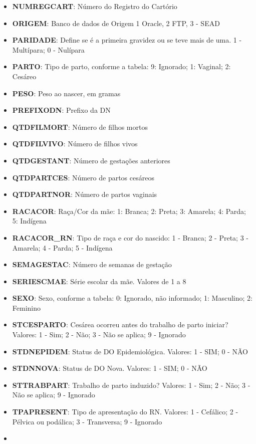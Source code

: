 \documentclass[
]{article}
\begin{document}
\begin{itemize}
\item
  \textbf{NUMREGCART}: Número do Registro do Cartório
\item
  \textbf{ORIGEM}: Banco de dados de Origem 1 Oracle, 2 FTP, 3 - SEAD
\item
  \textbf{PARIDADE}: Define se é a primeira gravidez ou se teve mais de
  uma. 1 - Multípara; 0 - Nulípara
\item
  \textbf{PARTO}: Tipo de parto, conforme a tabela: 9: Ignorado; 1:
  Vaginal; 2: Cesáreo
\item
  \textbf{PESO}: Peso ao nascer, em gramas
\item
  \textbf{PREFIXODN}: Prefixo da DN
\item
  \textbf{QTDFILMORT}: Número de filhos mortos
\item
  \textbf{QTDFILVIVO}: Número de filhos vivos
\item
  \textbf{QTDGESTANT}: Número de gestações anteriores
\item
  \textbf{QTDPARTCES}: Número de partos cesáreos
\item
  \textbf{QTDPARTNOR}: Número de partos vaginais
\item
  \textbf{RACACOR}: Raça/Cor da mãe: 1: Branca; 2: Preta; 3: Amarela; 4:
  Parda; 5: Indígena
\item
  \textbf{RACACOR\_RN}: Tipo de raça e cor do nascido: 1 - Branca; 2 -
  Preta; 3 - Amarela; 4 - Parda; 5 - Indígena
\item
  \textbf{SEMAGESTAC}: Número de semanas de gestação
\item
  \textbf{SERIESCMAE}: Série escolar da mãe. Valores de 1 a 8
\item
  \textbf{SEXO}: Sexo, conforme a tabela: 0: Ignorado, não informado; 1:
  Masculino; 2: Feminino
\item
  \textbf{STCESPARTO}: Cesárea ocorreu antes do trabalho de parto
  iniciar? Valores: 1 - Sim; 2 - Não; 3 - Não se aplica; 9 - Ignorado
\item
  \textbf{STDNEPIDEM}: Status de DO Epidemiológica. Valores: 1 - SIM; 0
  - NÃO
\item
  \textbf{STDNNOVA}: Status de DO Nova. Valores: 1 - SIM; 0 - NÃO
\item
  \textbf{STTRABPART}: Trabalho de parto induzido? Valores: 1 - Sim; 2 -
  Não; 3 - Não se aplica; 9 - Ignorado
\item
  \textbf{TPAPRESENT}: Tipo de apresentação do RN. Valores: 1 -
  Cefálico; 2 - Pélvica ou podálica; 3 - Transversa; 9 - Ignorado
\item

\end{itemize}
\end{document}
